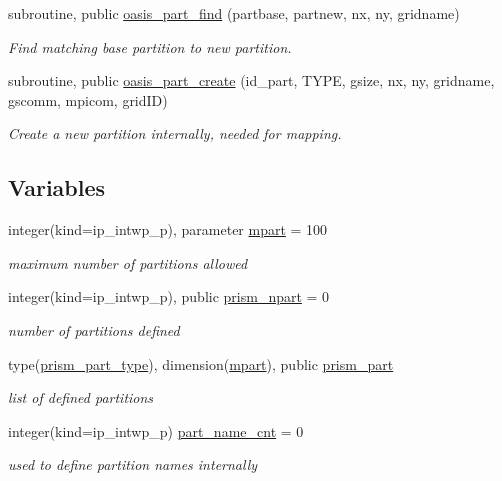 \begin{DoxyCompactItemize}
subroutine, public \hyperlink{namespacemod__oasis__part_ac0db50937fb4217da43edcd1d1536535}{oasis\+\_\+part\+\_\+find} (partbase, partnew, nx, ny, gridname)
\begin{DoxyCompactList}\small\item\em Find matching base partition to new partition. \end{DoxyCompactList}\item 
subroutine, public \hyperlink{namespacemod__oasis__part_aacc20c24f42edbef4ec2610bf98aadfc}{oasis\+\_\+part\+\_\+create} (id\+\_\+part, T\+Y\+PE, gsize, nx, ny, gridname, gscomm, mpicom, grid\+ID)
\begin{DoxyCompactList}\small\item\em Create a new partition internally, needed for mapping. \end{DoxyCompactList}\end{DoxyCompactItemize}
\subsection*{Variables}
\begin{DoxyCompactItemize}
\item 
integer(kind=ip\+\_\+intwp\+\_\+p), parameter \hyperlink{namespacemod__oasis__part_ab68d087792db0351181c9a97025d793b}{mpart} = 100
\begin{DoxyCompactList}\small\item\em maximum number of partitions allowed \end{DoxyCompactList}\item 
integer(kind=ip\+\_\+intwp\+\_\+p), public \hyperlink{namespacemod__oasis__part_ac8340e63b159a9786ad8fffabd1d47f8}{prism\+\_\+npart} = 0
\begin{DoxyCompactList}\small\item\em number of partitions defined \end{DoxyCompactList}\item 
type(\hyperlink{structmod__oasis__part_1_1prism__part__type}{prism\+\_\+part\+\_\+type}), dimension(\hyperlink{namespacemod__oasis__part_ab68d087792db0351181c9a97025d793b}{mpart}), public \hyperlink{namespacemod__oasis__part_a326ce52f630ba7e71905af864a6cb2dc}{prism\+\_\+part}
\begin{DoxyCompactList}\small\item\em list of defined partitions \end{DoxyCompactList}\item 
integer(kind=ip\+\_\+intwp\+\_\+p) \hyperlink{namespacemod__oasis__part_a8cee930f023feb7bcad4a0cab0b490a1}{part\+\_\+name\+\_\+cnt} = 0
\begin{DoxyCompactList}\small\item\em used to define partition names internally \end{DoxyCompactList}\end{DoxyCompactItemize}


